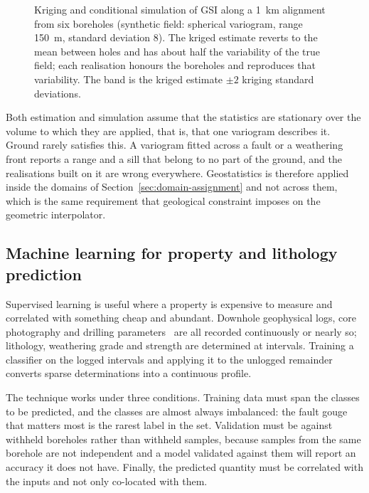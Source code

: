 \begin{figure}[htbp]
\centering
{}
\caption{Kriging and conditional simulation of GSI along a 1~km alignment from six boreholes (synthetic field: spherical variogram, range 150~m, standard deviation 8). The kriged estimate reverts to the mean between holes and has about half the variability of the true field; each realisation honours the boreholes and reproduces that variability. The band is the kriged estimate $\pm 2$ kriging standard deviations.}
\label{fig:kriging-simulation}
\end{figure}

Both estimation and simulation assume that the statistics are stationary over
the volume to which they are applied, that is, that one variogram describes
it. Ground rarely satisfies this. A variogram fitted across a fault or a weathering
front reports a range and a sill that belong to no part of the ground, and
the realisations built on it are wrong everywhere. Geostatistics is therefore
applied inside the domains of Section~\ref{sec:domain-assignment} and not
across them, which is the same requirement that geological constraint
imposes on the geometric interpolator.

\subsection{Machine learning for property and lithology prediction}
\label{sec:ml-ground-modelling}

Supervised learning is useful where a property is expensive to
measure and correlated with something cheap and abundant. Downhole geophysical
logs, core photography and drilling
parameters~\citep{schunnesson1996rqd} are all recorded continuously
or nearly so; lithology, weathering grade and strength are determined at
intervals. Training a classifier on the logged intervals and applying it to
the unlogged remainder converts sparse determinations into a continuous
profile.

The technique works under three conditions. Training data must span the
classes to be predicted, and the classes are almost always imbalanced: the
fault gouge that matters most is the rarest label in the set. Validation must
be against withheld boreholes rather than withheld samples, because samples
from the same borehole are not independent and a model validated against them
will report an accuracy it does not have. Finally, the predicted quantity must
be correlated with the inputs and not only co-located with them.

